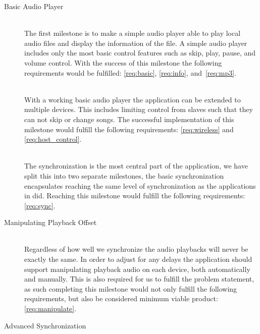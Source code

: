 \begin{description}
    \item [Basic Audio Player] \hfill \\
        The first milestone is to make a simple audio player able to play local audio files and display the information of the file.
        A simple audio player includes only the most basic control features such as skip, play, pause, and volume control.
        With the success of this milestone the following requirements would be fulfilled: \ref{req:basic}, \ref{req:info}, and~\ref{req:mp3}.
    \item [] \hfill \\
        With a working basic audio player the application can be extended to multiple devices.
        This includes limiting control from slaves such that they can not skip or change songs.
        The successful implementation of this milestone would fulfill the following requirements: \ref{req:wireless} and \ref{req:host_control}.
    \item [] \hfill \\
        The synchronization is the most central part of the application, we have split this into two separate milestones, the basic synchronization encapsulates reaching the same level of synchronization as the applications in  did.
        Reaching this milestone would fulfill the following requirements: \ref{req:sync}.
    \item [Manipulating Playback Offset] \hfill \\ %
        Regardless of how well we synchronize the audio playbacks will never be exactly the same.
        In order to adjust for any delays the application should support manipulating playback audio on each device, both automatically and manually.
        This is also required for us to fulfill the problem statement, as such completing this milestone would not only fulfill the following requirements, but also be considered minimum viable product: \ref{req:manipulate}.
    \item [Advanced Synchronization] \hfill \\

\end{description}
